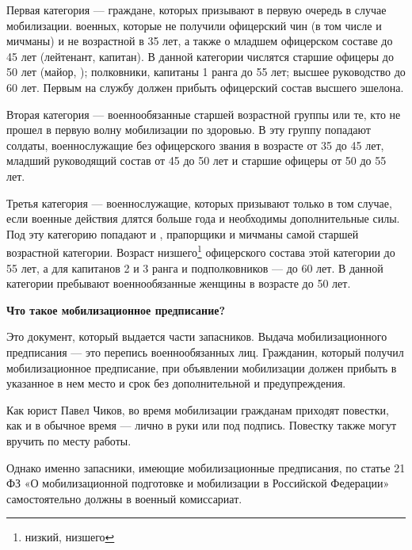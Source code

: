 Первая категория — граждане, которых призывают в первую очередь в случае мобилизации.  военных, которые не получили офицерский чин (в том числе  и мичманы) и не  возрастной  в 35 лет, а также о младшем офицерском составе до 45 лет (лейтенант, капитан). В данной категории числятся старшие офицеры до 50 лет (майор, ); полковники, капитаны 1 ранга до 55 лет; высшее руководство до 60 лет. Первым на службу должен прибыть офицерский состав высшего эшелона.

Вторая категория — военнообязанные старшей возрастной группы или те, кто не прошел в первую волну мобилизации по здоровью. В эту группу попадают солдаты, военнослужащие без офицерского звания в возрасте от 35 до 45 лет, младший руководящий состав от 45 до 50 лет и старшие офицеры от 50 до 55 лет.

Третья категория — военнослужащие, которых призывают только в том случае, если военные действия длятся больше года и необходимы дополнительные силы. Под эту категорию попадают  и , прапорщики и мичманы самой старшей возрастной категории. Возраст низшего\footnote{низкий, низшего} офицерского состава этой категории до 55 лет, а для капитанов 2 и 3 ранга и подполковников — до 60 лет. В данной категории пребывают военнообязанные женщины в возрасте до 50 лет.

\textbf{Что такое мобилизационное предписание? }

Это документ, который выдается части запасников. Выдача мобилизационного предписания — это  перепись военнообязанных лиц. Гражданин, который получил мобилизационное предписание, при объявлении мобилизации должен прибыть в указанное в нем место и срок без дополнительной  и предупреждения.

Как  юрист Павел Чиков, во время мобилизации гражданам приходят повестки, как и в обычное время — лично в руки или под подпись. Повестку также могут вручить по месту работы.

Однако именно запасники, имеющие мобилизационные предписания, по статье 21 ФЗ «О мобилизационной подготовке и мобилизации в Российской Федерации» самостоятельно должны  в военный комиссариат.

